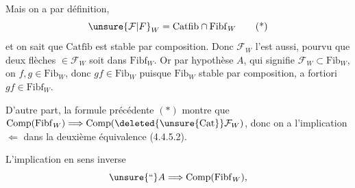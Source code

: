 
Mais on a par définition,
\[
 \unsure{\mathcal{F}|F}_{W}=\mathrm{Catfib}\cap\mathrm{Fibf}_{W} \tag*{(*)}
\]
et on sait que $\mathrm{Catfib}$ est stable par composition. Donc $\mathcal{F}_{W}$ l'est aussi, pourvu que   deux flèches $\in\mathcal{F}_{W}$ soit dans $\mathrm{Fibf}_{W}$. Or par hypothèse $A$, qui signifie $\mathcal{F}_{W}\subset\mathrm{Fib}_{W}$, on  $f,g\in\mathrm{Fib}_{W}$, donc $gf\in\mathrm{Fib}_{W}$ puisque $\mathrm{Fib}_{W}$ stable par composition, a fortiori $gf\in\mathrm{Fibf}_{W}$.

D'autre part, la formule précédente $(*)$ montre que $\mathrm{Comp}(\mathrm{Fibf}_{W})\Longrightarrow\mathrm{Comp}(\deleted{\unsure{\mathrm{Cat}}}\mathcal{F}_{W})$, donc on a  l'implication $\Longleftarrow$ dans la deuxième équivalence (4.4.5.2).

L'implication en sens inverse  
\[
 \unsure{\text{``}}A\Longrightarrow\mathrm{Comp}(\mathrm{Fibf}_{W}),
\]
